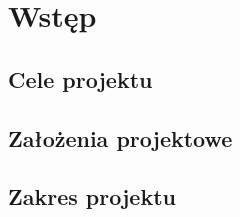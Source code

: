 \chapter{Wstęp}

\section{Cele projektu}

\section{Założenia projektowe}

\section{Zakres projektu}



